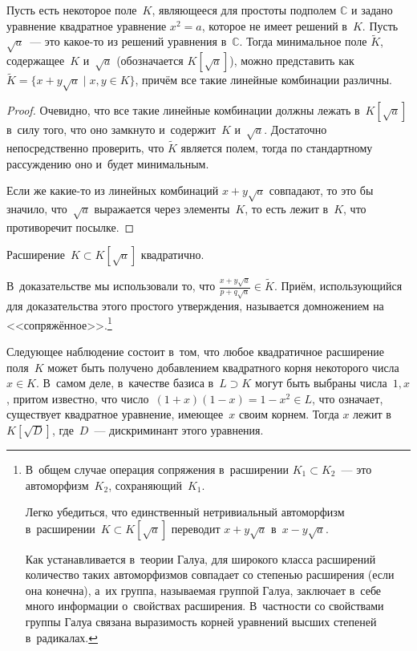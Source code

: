 \documentclass{article}
\begin{document}
\begin{claim}
  Пусть есть некоторое поле~$K$, являющееся для простоты подполем $\mathbb{C}$ и
  задано уравнение квадратное уравнение $x^2 = a$, которое не имеет решений
  в~$K$. Пусть $\sqrt{a}$~--- это какое-то из решений уравнения в~$\mathbb{C}$.
  Тогда минимальное поле $\widetilde{K}$, содержащее~$K$ и~$\sqrt{a}$
  (обозначается $K[\sqrt{a}]$), можно представить как~$\widetilde{K} = \{x +
  y\sqrt{a} \mid x, y \in K\}$, причём все такие линейные комбинации различны.
\end{claim}
\begin{proof}
  Очевидно, что все такие линейные комбинации должны лежать в~$K[\sqrt{a}]$
  в~силу того, что оно замкнуто и~содержит~$K$ и~$\sqrt{a}$. Достаточно
  непосредственно проверить, что $\widetilde{K}$ является полем, тогда по
  стандартному рассуждению оно и~будет минимальным.

  Если же какие-то из линейных комбинаций $x + y\sqrt{a}$ совпадают, то это бы
  значило, что~$\sqrt{a}$ выражается через элементы~$K$, то есть лежит в~$K$,
  что противоречит посылке.
\end{proof}

\begin{remark}
  Расширение~$K \subset K[\sqrt{a}]$ квадратично.
\end{remark}
\begin{remark}
  В~доказательстве мы использовали то, что $\frac{x + y\sqrt{a}}{p + q\sqrt{a}}
  \in \widetilde{K}$. Приём, использующийся для доказательства этого простого
  утверждения, называется домножением на <<сопряжённое>>.\footnote{В~общем
  случае операция сопряжения в~расширении $K_1 \subset K_2$~--- это
  автоморфизм~$K_2$, сохраняющий~$K_1$.

  Легко убедиться, что единственный нетривиальный автоморфизм в~расширении~$K
  \subset K[\sqrt{a}]$ переводит $x + y\sqrt{a}$ в~$x - y\sqrt{a}$.

  Как устанавливается в~теории Галуа, для широкого класса расширений количество
  таких автоморфизмов совпадает со степенью расширения (если она конечна), а~их
  группа, называемая группой Галуа, заключает в~себе много информации
  о~свойствах расширения. В~частности со свойствами группы Галуа связана
  выразимость корней уравнений высших степеней в~радикалах.}
\end{remark}

Следующее наблюдение состоит в~том, что любое квадратичное расширение поля~$K$
может быть получено добавлением квадратного корня некоторого числа $x \in K$.
В~самом деле, в~качестве базиса в~$L \supset K$ могут быть выбраны
числа~$1, x$, притом известно, что число~$(1 + x)(1 - x) = 1 - x^2 \in L$, что
означает, существует квадратное уравнение, имеющее~$x$ своим корнем. Тогда $x$
лежит в~$K[\sqrt{D}]$, где~$D$~--- дискриминант этого уравнения.
\end{document}
